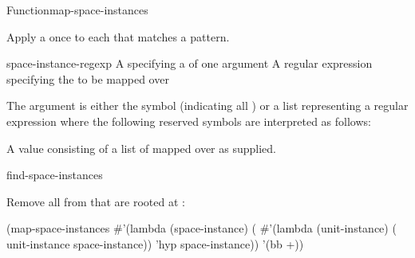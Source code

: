 \documentclass[10pt,twoside,english,pdftex]{article}
\begin{document}
\begin{functiondoc}{Function}{map-space-instances}%
  {}

\fnsyntax

\fnpurpose Apply a  once to each
 that matches a  pattern.

\fnpackage {}

\fnmodule {}

\fnargs
\begin{args}{space-instance-regexp}
\arg[function] A  specifying a 
  of one argument
 A  regular expression
specifying the  to be mapped over
\end{args}

\fndescription 
The  argument is either the symbol
 (indicating all ) or a list
representing a regular expression where the following reserved symbols
are interpreted as follows:
\spaceinstanceregexp

A  value consisting of a list of
 mapped over as supplied.

\begin{alsos}{find-space-instances}
\end{alsos}

\fnexample 
{}%
%
Remove all   from
 that are rooted at :
%
\W\supp
\begin{example}
  (map-space-instances 
    #'(lambda (space-instance)
        (
          #'(lambda (unit-instance)
              ( unit-instance space-instance))
          'hyp
          space-instance))
    '(bb +))
\end{example}

\end{functiondoc}

\end{document}

